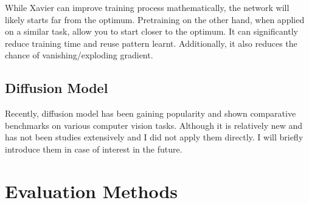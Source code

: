 While Xavier can improve training process mathematically, the network will likely starts far from the optimum. Pretraining on the other hand, when applied on a similar task, allow you to start closer to the optimum. It can significantly reduce training time and reuse pattern learnt. Additionally, it also reduces the chance of vanishing/exploding gradient.


\subsection{Diffusion Model}
Recently, diffusion model\cite{hoDenoisingDiffusionProbabilistic2020} has been gaining popularity and shown comparative benchmarks on various computer vision tasks\cite{sahariaPaletteImagetoImageDiffusion2022, dhariwalDiffusionModelsBeat2021}. Although it is relatively new and has not been studies extensively and I did not apply them directly. I will briefly introduce them in case of interest in the future.



\section{Evaluation Methods}


